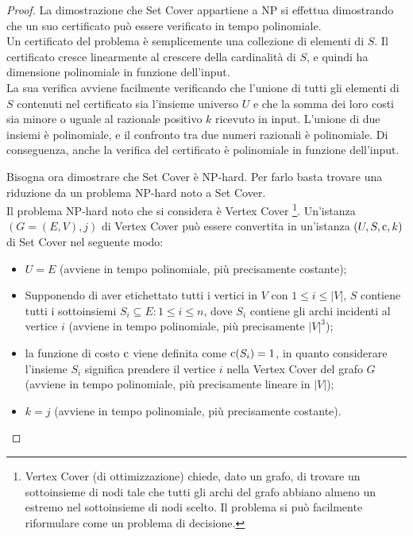 \begin{proof}
    La dimostrazione che Set Cover appartiene a NP si effettua dimostrando
    che un suo certificato può essere verificato in tempo polinomiale.\\
    Un certificato del problema è semplicemente una collezione di elementi
    di $S$. Il certificato cresce linearmente al crescere della cardinalità di
    $S$, e quindi ha dimensione polinomiale in funzione dell'input.\\
    La sua verifica avviene facilmente verificando che l'unione di tutti gli
    elementi di $S$ contenuti nel certificato sia l'insieme universo $U$ e che
    la somma dei loro costi sia minore o uguale al razionale positivo $k$
    ricevuto in input. L'unione di due insiemi è polinomiale, e il confronto
    tra due numeri razionali è polinomiale. Di conseguenza, anche la verifica
    del certificato è polinomiale in funzione dell'input.

    Bisogna ora dimostrare che Set Cover è NP-hard. Per farlo basta trovare
    una riduzione da un problema NP-hard noto a Set Cover.\\
    Il problema NP-hard noto che si considera è Vertex Cover
    \footnote{Vertex Cover (di ottimizzazione) chiede, dato un grafo,
    di trovare un sottoinsieme di nodi tale che tutti gli archi del grafo
    abbiano almeno un estremo nel sottoinsieme di nodi scelto. Il problema
    si può facilmente riformulare come un problema di decisione.}.
    Un'istanza $(G = (E,V), j)$ di Vertex Cover può essere convertita in
    un'istanza $(U, S, \textnormal{c}, k)$ di Set Cover nel seguente modo:
    \begin{itemize}
        \item $U=E$ (avviene in tempo polinomiale, più precisamente costante);
        \item Supponendo di aver etichettato tutti i vertici in $V$ con
        $1 \le i \le |V|$, $S$ contiene tutti i sottoinsiemi
        $S_i \subseteq E : 1 \le i \le n$, dove $S_i$ contiene gli archi
        incidenti al vertice $i$
        (avviene in tempo polinomiale, più precisamente $|V|^3$);
        \item la funzione di costo
        $\textnormal{c}$ viene definita come $\textnormal{c}(S_i) = 1$,
        in quanto considerare l'insieme $S_i$ significa prendere il
        vertice $i$ nella Vertex Cover del grafo $G$
        (avviene in tempo polinomiale, più precisamente lineare in $|V|$);
        \item $k = j$ (avviene in tempo polinomiale, più precisamente costante).
    \end{itemize}


\end{proof}
